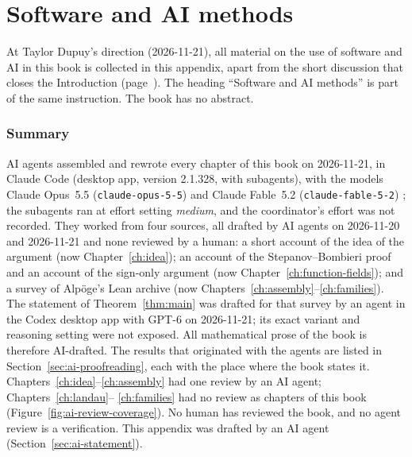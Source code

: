\documentclass[11pt]{amsbook}
\theoremstyle{plain}
\theoremstyle{definition}
\theoremstyle{remark}
\numberwithin{equation}{section}
\numberwithin{figure}{chapter}
\numberwithin{table}{chapter}
\begin{document}
\chapter{Software and AI methods}
\label{ch:ai}
\label{app:ai-methods}
\sloppy

At Taylor Dupuy's direction (2026-11-21), all material on the use of
software and AI in this book is collected in this appendix, apart
from the short discussion that closes the Introduction
(page~\pageref{intro:ai}). The heading ``Software and AI methods'' is
part of the same instruction. The book has no abstract.

\subsection*{Summary}
AI agents assembled and rewrote every chapter of this book on
2026-11-21, in Claude Code
\cite[\href{https://claude.com/claude-code}{product page}]{ClaudeCode}
(desktop app, version 2.1.328, with subagents), with the models
Claude Opus~5.5 (\texttt{claude-opus-5-5})
\cite[\href{https://platform.claude.com/docs/en/models/opus-5-5/overview}%
{model page}]{ClaudeOpus55} and Claude Fable~5.2
(\texttt{claude-fable-5-2})
\cite[\href{https://platform.claude.com/docs/en/models/fable-5-2/overview}%
{model page}]{ClaudeFable52}; the subagents ran at effort setting
\emph{medium}, and the coordinator's effort was not recorded. They
worked from four sources, all drafted by AI agents on 2026-11-20
and 2026-11-21 and none reviewed by a human: a short account of the
idea of the argument (now Chapter~\ref{ch:idea}); an account of the
Stepanov--Bombieri proof and an account of the sign-only argument
(now Chapter~\ref{ch:function-fields}); and a survey of Alp\"oge's
Lean archive (now Chapters~\ref{ch:assembly}--\ref{ch:families}). The
statement of Theorem~\ref{thm:main} was drafted for that survey by an
agent in the Codex desktop app
\cite[\href{https://openai.com/index/introducing-the-codex-app/}%
{product page}]{OpenAI2026codex} with GPT-6
\cite[\href{https://help.openai.com/en/articles/%
20001354-gpt-6-and-other-models-in-chatgpt}%
{model guide}]{OpenAI2026gpt} on 2026-11-21; its exact variant and
reasoning setting were not exposed. All mathematical prose of the book
is therefore AI-drafted. The results that originated with the agents
are listed in Section~\ref{sec:ai-proofreading}, each with the place
where the book states it. Chapters~\ref{ch:idea}--\ref{ch:assembly}
had one review by an AI agent; Chapters~\ref{ch:landau}--%
\ref{ch:families} had no review as chapters of this book (Figure~\ref{fig:ai-review-coverage}). No human has
reviewed the book, and no agent review is a verification.
This appendix was drafted by an AI agent (Section~\ref{sec:ai-statement}).
\end{document}
